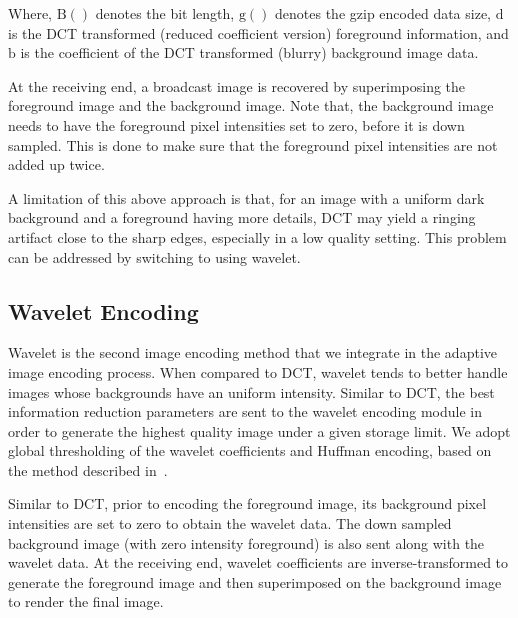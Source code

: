 Where, $\mathrm{B()}$ denotes the bit length, $\mathrm{g()}$ denotes the gzip encoded data size, $\mathrm{d}$ is the DCT transformed (reduced coefficient version) foreground information, and $\mathrm{b}$ is the coefficient of the DCT transformed (blurry) background image data.

At the receiving end, a broadcast image is recovered by superimposing the foreground image and the background image. Note that, the background image needs to have the foreground pixel intensities set to zero, before it is down sampled. This is done to make sure that the foreground pixel intensities are not added up twice.



A limitation of this above approach is that, for an image with a uniform dark background and a foreground having more details, DCT may yield a ringing artifact close to the sharp edges, especially in a low quality setting. This problem can be addressed by switching to using wavelet.


\subsection{Wavelet Encoding}

Wavelet is the second image encoding method that we integrate in the adaptive image encoding process. When compared to DCT, wavelet tends to better handle images whose backgrounds have an uniform intensity. Similar to DCT, the best information reduction parameters are sent to the wavelet encoding module in order to generate the highest quality image under a given storage limit. We adopt global thresholding of the wavelet coefficients and Huffman encoding, based on the method described in~\cite{said1996new}.

Similar to DCT, prior to encoding the foreground image, its background pixel intensities are set to zero to obtain the wavelet data. The down sampled background image (with zero intensity foreground) is also sent along with the wavelet data. At the receiving end, wavelet coefficients are inverse-transformed to generate the foreground image and then superimposed on the background image to render the final image.

